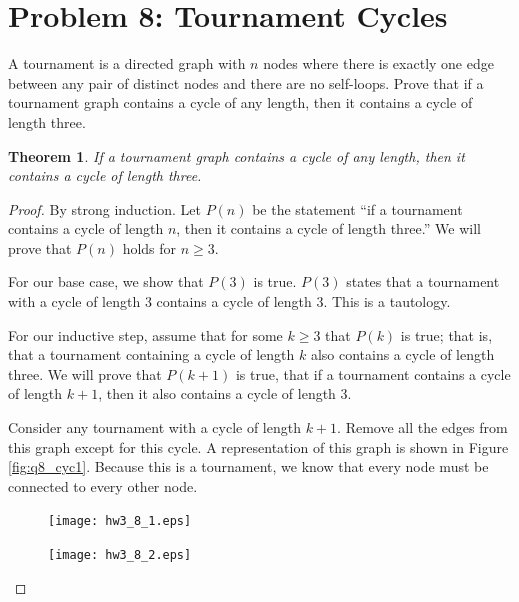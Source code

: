 \documentclass[10pt,letter]{article}
\newtheorem*{thm}{Theorem}
\begin{document}
\section*{Problem 8: Tournament Cycles}
A tournament is a directed graph with $n$ nodes where there is exactly one edge between any pair of distinct nodes and there are no self-loops. Prove that if a tournament graph contains a cycle of any length, then it contains a cycle of length three.

\begin{thm} If a tournament graph contains a cycle of any length, then it contains a cycle of length three.
\end{thm}

\begin{proof} By strong induction. Let $P(n)$ be the statement ``if a tournament contains a cycle of length $n$, then it contains a cycle of length three.'' We will prove that $P(n)$ holds for $n \ge 3$. 

For our base case, we show that $P(3)$ is true. $P(3)$ states that a tournament with a cycle of length 3 contains a cycle of length 3. This is a tautology.

For our inductive step, assume that for some $k \ge 3$ that $P(k)$ is true; that is, that a tournament containing a cycle of length $k$ also contains a cycle of length three. We will prove that $P(k+1)$ is true, that if a tournament contains a cycle of length $k+1$, then it also contains a cycle of length 3.

Consider any tournament with a cycle of length $k+1$. Remove all the edges from this graph except for this cycle. A representation of this graph is shown in Figure \ref{fig:q8_cyc1}. Because this is a tournament, we know that every node must be connected to every other node. 

\begin{figure}
\centering
\begin{minipage}{.5\textwidth}
  \centering
  \texttt{[image: hw3\_8\_1.eps]}
  \label{fig:q8_cyc1}
\end{minipage}%
\begin{minipage}{.5\textwidth}
  \centering
  \texttt{[image: hw3\_8\_2.eps]}
  \label{fig:q8_test2}
\end{minipage}
\end{figure}

\end{proof}


\end{document}
